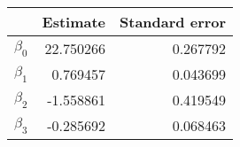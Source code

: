 \begin{tabular}{lrr}
\toprule
{} &   Estimate &  Standard error \\
\midrule
$\beta_0$ &  22.750266 &        0.267792 \\
$\beta_1$ &   0.769457 &        0.043699 \\
$\beta_2$ &  -1.558861 &        0.419549 \\
$\beta_3$ &  -0.285692 &        0.068463 \\
\bottomrule
\end{tabular}
